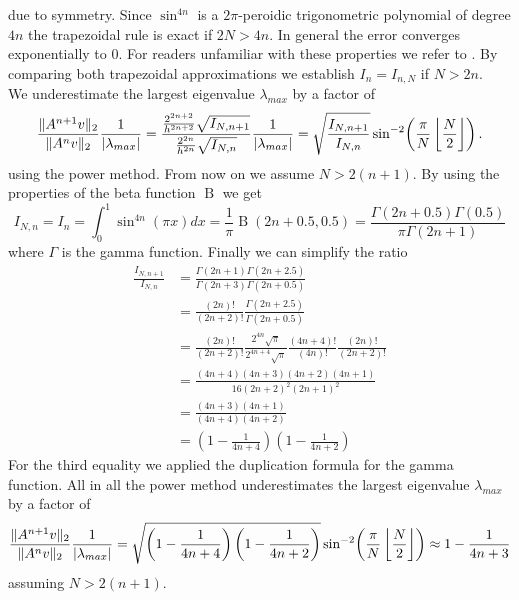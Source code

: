 \documentclass{scrartcl}
\begin{document}
	due to symmetry. Since $\sin^{4n}$ is a $2\pi$-peroidic trigonometric polynomial of degree $4n$ the trapezoidal rule is exact if $2N>4n$. In general the error converges exponentially to $0$. For readers unfamiliar with these properties we refer to \cite[Corollary 3.3]{trapezoidal}. 
	By comparing both trapezoidal approximations we establish $I_n = I_{n,N}$ if $N > 2n$.\\
	We underestimate the largest eigenvalue $\lambda_{max}$ by a factor of
	\begin{align*}
	\frac{\lVert A^{n+1}v\rVert_2}{\lVert A^nv\rVert_2}\frac{1}{\lvert\lambda_{max}\rvert}
	= \frac{\frac{2^{2n+2}}{h^{2n+2}}\sqrt{I_{N,n+1}}}{\frac{2^{2n}}{h^{2n}}\sqrt{I_{N,n}}}\frac{1}{\lvert\lambda_{max}\rvert} = \sqrt{\frac{I_{N,n+1}}{I_{N,n}}}\sin^{-2}\!\left(\frac{\pi}{N}\left\lfloor\frac{N}{2}\right\rfloor\right).
	\end{align*}
	using the power method. From now on we assume $N > 2(n+1)$. By using the properties of the beta function $\operatorname{B}$ we get
	\[
	I_{N,n} = I_{n} = \int_{0}^{1} \sin^{4n}(\pi x)dx = \frac{1}{\pi} \operatorname{B}(2n+0.5,0.5) = \frac{\Gamma(2n + 0.5)\Gamma(0.5)}{\pi \Gamma(2n + 1)}
	\]
	\noindent where $\Gamma$ is the gamma function. Finally we can simplify the ratio
	\begin{align*}
	\frac{I_{N,n+1}}{I_{N,n}} &=   
	\frac{\Gamma(2n + 1)\Gamma(2n + 2.5)}{\Gamma(2n + 3)\Gamma(2n + 0.5)} \\&= 
	\frac{(2n)!}{(2n+2)!}
	\frac{\Gamma(2n + 2.5)}{\Gamma(2n + 0.5)}\\&=
	\frac{(2n)!}{(2n+2)!}
	\frac{2^{4n}\sqrt\pi}{2^{4n+4}\sqrt\pi}
	\frac{(4n+4)!}{(4n)!}
	\frac{(2n)!}{(2n+2)!} \\&=
	\frac{(4n+4)(4n+3)(4n+2)(4n+1)}{16(2n+2)^2(2n+1)^2} \\&=
	\frac{(4n+3)(4n+1)}{(4n+4)(4n+2)}\\&=
	\left(1-\frac{1}{4n+4}\right)\left(1-\frac{1}{4n+2}\right)
	\end{align*}
	For the third equality we applied the duplication formula for the gamma function. All in all the power method underestimates the largest eigenvalue $\lambda_{max}$ by a factor of 
	\[
	\frac{\lVert A^{n+1}v\rVert_2}{\lVert A^{n}v\rVert_2}\frac{1}{\lvert\lambda_{max}\rvert} =
	\sqrt{\left(1-\frac{1}{4n+4}\right)\left(1-\frac{1}{4n+2}\right)}\sin^{-2}\!\left(\frac{\pi}{N}\left\lfloor\frac{N}{2}\right\rfloor\right) \approx 1-\frac{1}{4n+3}
	\]
	assuming $N>2(n+1)$. %
\end{document}
